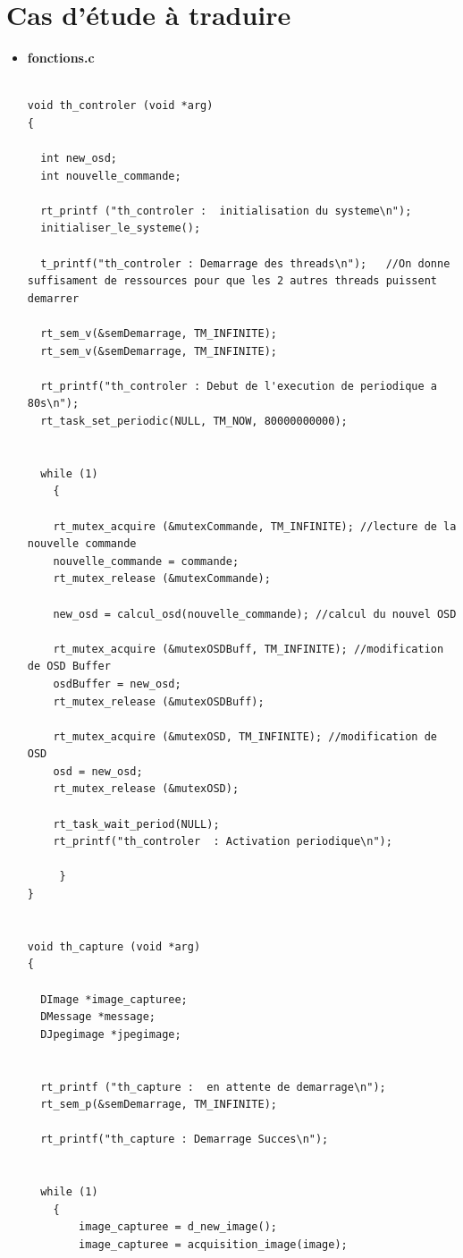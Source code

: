 \documentclass[11pt, a4paper]{paper}
\begin{document}
\section{Cas d'étude à traduire}
\label{ann:conception}
\begin{itemize}
\item \large{\bf fonctions.c}

\lstset{language=C} 
\begin{lstlisting}

void th_controler (void *arg)
{

  int new_osd;
  int nouvelle_commande;

  rt_printf ("th_controler :  initialisation du systeme\n");
  initialiser_le_systeme();

  t_printf("th_controler : Demarrage des threads\n");   //On donne suffisament de ressources pour que les 2 autres threads puissent demarrer

  rt_sem_v(&semDemarrage, TM_INFINITE);
  rt_sem_v(&semDemarrage, TM_INFINITE);

  rt_printf("th_controler : Debut de l'execution de periodique a 80s\n");
  rt_task_set_periodic(NULL, TM_NOW, 80000000000);


  while (1)
    {

    rt_mutex_acquire (&mutexCommande, TM_INFINITE); //lecture de la nouvelle commande
    nouvelle_commande = commande;
    rt_mutex_release (&mutexCommande);

    new_osd = calcul_osd(nouvelle_commande); //calcul du nouvel OSD

    rt_mutex_acquire (&mutexOSDBuff, TM_INFINITE); //modification de OSD Buffer
    osdBuffer = new_osd;
    rt_mutex_release (&mutexOSDBuff);

    rt_mutex_acquire (&mutexOSD, TM_INFINITE); //modification de OSD
    osd = new_osd;
    rt_mutex_release (&mutexOSD);

    rt_task_wait_period(NULL);
    rt_printf("th_controler  : Activation periodique\n");

	 }
}


void th_capture (void *arg)
{

  DImage *image_capturee;
  DMessage *message;
  DJpegimage *jpegimage;


  rt_printf ("th_capture :  en attente de demarrage\n");
  rt_sem_p(&semDemarrage, TM_INFINITE);

  rt_printf("th_capture : Demarrage Succes\n");


  while (1)
    {
        image_capturee = d_new_image();
        image_capturee = acquisition_image(image);


\end{lstlisting}
\end{itemize}
\end{document}
